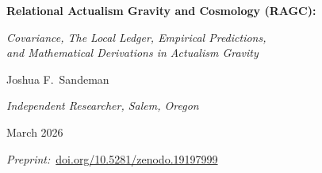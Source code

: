 \documentclass[11pt,a4paper]{article}
\theoremstyle{plain}
\theoremstyle{definition}
\theoremstyle{remark}
\begin{document}
\begin{titlepage}
\centering
\vspace*{1cm}
{\LARGE\bfseries Relational Actualism Gravity and Cosmology (RAGC):\par}
\vspace{0.4cm}
{\large\itshape Covariance, The Local Ledger, Empirical Predictions,\\
and Mathematical Derivations in Actualism Gravity\par}
\vspace{1.2cm}
{\large Joshua F.\ Sandeman\par}
\vspace{0.3cm}
{\normalsize\itshape Independent Researcher, Salem, Oregon\par}
\vspace{0.3cm}
{\normalsize March 2026\par}
\vspace{0.3cm}
  {\small\textit{Preprint:}~\href{https://doi.org/10.5281/zenodo.19197999}
    {doi.org/10.5281/zenodo.19197999}\par}
\vspace{1.5cm}


\end{titlepage}
\end{document}
